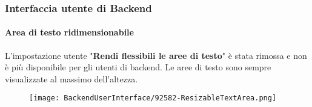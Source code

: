 %

\begin{frame}[fragile]
	\frametitle{Interfaccia utente di Backend}
	\framesubtitle{Area di testo ridimensionabile}

	L'impostazione utente "\textbf{Rendi flessibili le aree di testo}" è stata rimossa e non è più disponibile
	per gli utenti di backend.
	Le aree di testo sono sempre visualizzate al massimo dell'altezza.

	\begin{figure}
		\texttt{[image: BackendUserInterface/92582-ResizableTextArea.png]}
	\end{figure}

\end{frame}

